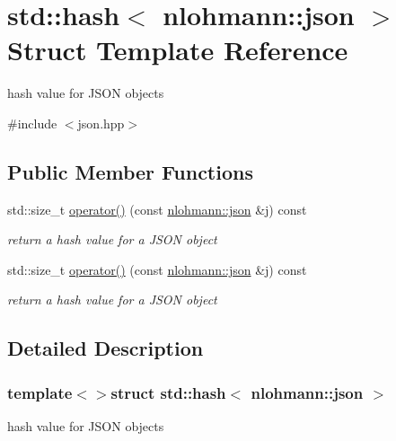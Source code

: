 \hypertarget{structstd_1_1hash_3_01nlohmann_1_1json_01_4}{\section{std\-:\-:hash$<$ nlohmann\-:\-:json $>$ Struct Template Reference}
\label{structstd_1_1hash_3_01nlohmann_1_1json_01_4}
}


hash value for J\-S\-O\-N objects  




{\ttfamily \#include $<$json.\-hpp$>$}

\subsection*{Public Member Functions}
\begin{DoxyCompactItemize}
\item 
std\-::size\-\_\-t \hyperlink{structstd_1_1hash_3_01nlohmann_1_1json_01_4_afd03f6ad53db22868ca4163a8200b2f9}{operator()} (const \hyperlink{namespacenlohmann_a9cc9a3033850a092f791d86854d117fc}{nlohmann\-::json} \&j) const 
\begin{DoxyCompactList}\small\item\em return a hash value for a J\-S\-O\-N object \end{DoxyCompactList}\item 
std\-::size\-\_\-t \hyperlink{structstd_1_1hash_3_01nlohmann_1_1json_01_4_afd03f6ad53db22868ca4163a8200b2f9}{operator()} (const \hyperlink{namespacenlohmann_a9cc9a3033850a092f791d86854d117fc}{nlohmann\-::json} \&j) const 
\begin{DoxyCompactList}\small\item\em return a hash value for a J\-S\-O\-N object \end{DoxyCompactList}\end{DoxyCompactItemize}


\subsection{Detailed Description}
\subsubsection*{template$<$$>$struct std\-::hash$<$ nlohmann\-::json $>$}

hash value for J\-S\-O\-N objects 

